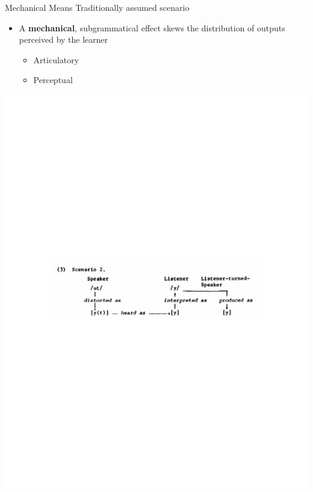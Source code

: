 \documentclass[hyperref={pdfpagelabels=false}]{beamer}
\begin{document}
\begin{frame}{Mechanical Means}
	Traditionally assumed scenario \citep{Ohala1981} \\
	\begin{itemize}
		\item A \textbf{mechanical}, subgrammatical effect skews the distribution of outputs perceived by the learner 
		\begin{itemize} \pause
			\item Articulatory \pause
			\item Perceptual \pause
		\end{itemize}
	\end{itemize}
	\begin{center}
\includegraphics[trim=2cm 2cm 2cm 10cm, clip=true, width=1\textwidth]{Ohala81.pdf}

\end{center}
\end{frame}
\end{document}
